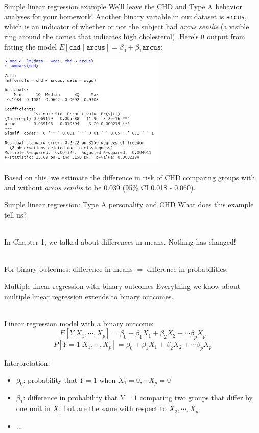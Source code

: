\documentclass[10pt,t]{beamer}
\begin{document}
\begin{frame}{Simple linear regression example}
	\vspace{-0.8cm}
	We'll leave the CHD and Type A behavior analyses for your homework! Another binary variable in our dataset is \texttt{arcus}, which is an indicator of whether or not the subject had \textit{arcus senilis} (a visible ring around the cornea that indicates high cholesterol). Here's \texttt{R} output from fitting the model $E[\texttt{chd} \mid \texttt{arcus}] = \beta_0 + \beta_1 \texttt{arcus}$:
	
	\begin{center}
		\includegraphics[width=0.6\textwidth]{./figs/simple_linear_regression_arcus}
	\end{center}
	\vspace{-0.2cm}
	Based on this, we estimate the difference in risk of CHD comparing groups with and without \textit{arcus senilis} to be 0.039 (95\% CI 0.018 - 0.060). 
	
\end{frame}

\begin{frame}{Simple linear regression: Type A personality and CHD}
	What does this example tell us? 
	\\ ~\
	
	In Chapter 1, we talked about differences in means. Nothing has changed!
	\\ ~\

	For binary outcomes: difference in means $=$ difference in probabilities.
\end{frame}

\begin{frame}{Multiple linear regression with binary outcomes}
	Everything we know about multiple linear regression extends to binary outcomes. 
	\\ ~\
	
	Linear regression model with a binary outcome: $$E[Y|X_1,\cdots,X_p] = \beta_0 + \beta_1 X_1 + \beta_2X_2 + \cdots \beta_p X_p$$ $$P[Y=1|X_1,\cdots,X_p] = \beta_0 + \beta_1 X_1 + \beta_2 X_2 + \cdots \beta_p X_p$$
	
	\color{blue} Interpretation: \color{black}
	\begin{itemize} 
		\item $\beta_0$: \pause probability that $Y=1$ when $X_1 = 0, \cdots X_p = 0$
		\item $\beta_1$: \pause difference in probability that $Y=1$ comparing two groups that differ by one unit in $X_1$ but are the same with respect to $X_2,\cdots,X_p$ 
		\item ...
	\end{itemize}
\end{frame}
\end{document}
